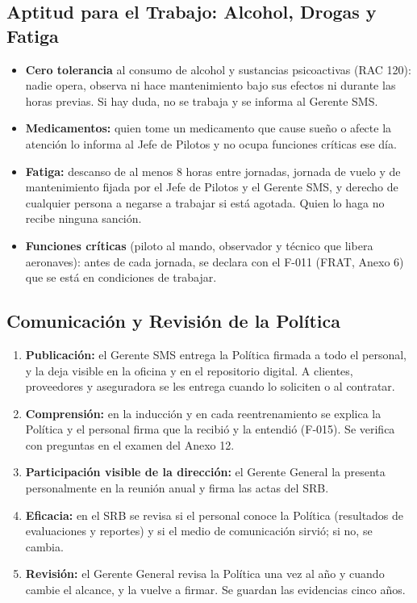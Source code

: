 \subsection{Aptitud para el Trabajo: Alcohol, Drogas y Fatiga}
\begin{itemize}
    \item \textbf{Cero tolerancia} al consumo de alcohol y sustancias psicoactivas (RAC 120): nadie opera, observa ni hace mantenimiento bajo sus efectos ni durante las horas previas. Si hay duda, no se trabaja y se informa al Gerente SMS.
    \item \textbf{Medicamentos:} quien tome un medicamento que cause sueño o afecte la atención lo informa al Jefe de Pilotos y no ocupa funciones críticas ese día.
    \item \textbf{Fatiga:} descanso de al menos 8 horas entre jornadas, jornada de vuelo y de mantenimiento fijada por el Jefe de Pilotos y el Gerente SMS, y derecho de cualquier persona a negarse a trabajar si está agotada. Quien lo haga no recibe ninguna sanción.
    \item \textbf{Funciones críticas} (piloto al mando, observador y técnico que libera aeronaves): antes de cada jornada, se declara con el F-011 (FRAT, Anexo 6) que se está en condiciones de trabajar.
\end{itemize}

\subsection{Comunicación y Revisión de la Política}
\begin{enumerate}
    \item \textbf{Publicación:} el Gerente SMS entrega la Política firmada a todo el personal, y la deja visible en la oficina y en el repositorio digital. A clientes, proveedores y aseguradora se les entrega cuando lo soliciten o al contratar.
    \item \textbf{Comprensión:} en la inducción y en cada reentrenamiento se explica la Política y el personal firma que la recibió y la entendió (F-015). Se verifica con preguntas en el examen del Anexo 12.
    \item \textbf{Participación visible de la dirección:} el Gerente General la presenta personalmente en la reunión anual y firma las actas del SRB.
    \item \textbf{Eficacia:} en el SRB se revisa si el personal conoce la Política (resultados de evaluaciones y reportes) y si el medio de comunicación sirvió; si no, se cambia.
    \item \textbf{Revisión:} el Gerente General revisa la Política una vez al año y cuando cambie el alcance, y la vuelve a firmar. Se guardan las evidencias cinco años.
\end{enumerate}

